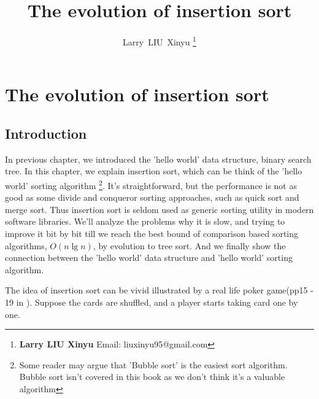 \documentclass{article}
\begin{document}


\title{The evolution of insertion sort}

\author{Larry~LIU~Xinyu
\thanks{{\bfseries Larry LIU Xinyu } \newline
  Email: liuxinyu95@gmail.com \newline}
  }

\maketitle
\fi


\ifx\wholebook\relax
\chapter{The evolution of insertion sort}
\fi

\section{Introduction}
\label{introduction} 
In previous chapter, we introduced the 'hello world' data structure,
binary search tree. In this chapter, we explain insertion sort,
which can be think of the 'hello world' sorting algorithm
\footnote{Some reader may argue that 'Bubble sort' is the easiest
sort algorithm. Bubble sort isn't covered in this book as we don't
think it's a valuable algorithm\cite{wiki-bubble-sort}}.
It's straightforward, but the performance is not as good as some
divide and conqueror sorting approaches, such as quick sort
and merge sort. Thus insertion sort is seldom used as generic
sorting utility in modern software libraries. We'll analyze the
problems why it is slow, and trying to improve it bit by bit till
we reach the best bound of comparison based sorting algorithms, $O(n \lg n)$,
by evolution to tree sort. And we finally show the connection between
the 'hello world' data structure and 'hello world' sorting algorithm.

The idea of insertion sort can be vivid illustrated by a real life
poker game(pp15 - 19 in \cite{CLRS}). Suppose the cards are shuffled, and a player starts
taking card one by one.
\end{document}
